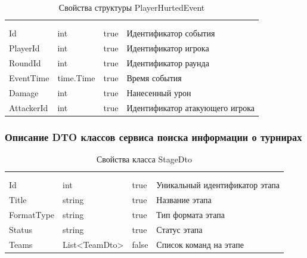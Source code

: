 \begin{xltabular}{\textwidth}{|X|X|X|X|}
	\caption{Свойства структуры PlayerHurtedEvent}\label{table:PlayerHurtedEvent}\\ \hline
	 &  &  &  \\ \hline
	 &  &  &  \\ \hline
	\endfirsthead
	 \hline
	 &  &  &  \\ \hline
	\endhead
	Id & int & true & Идентификатор события \\ \hline
	PlayerId & int & true & Идентификатор игрока \\ \hline
	RoundId & int & true & Идентификатор раунда \\ \hline
	EventTime & time.Time & true & Время события \\ \hline
	Damage & int & true & Нанесенный урон \\ \hline
	AttackerId & int & true & Идентификатор атакующего игрока \\ \hline
\end{xltabular}

\subsubsection{Описание DTO классов сервиса поиска информации о турнирах}

\begin{xltabular}{\textwidth}{|X|X|X|X|}
	\caption{Свойства класса StageDto}\label{table:StageDto}\\ \hline
	 &  &  &  \\ \hline
	 &  &  &  \\ \hline
	\endfirsthead
	 \hline
	 &  &  &  \\ \hline
	\endhead
	Id & int & true & Уникальный идентификатор этапа \\ \hline
	Title & string & true & Название этапа \\ \hline
	FormatType & string & true & Тип формата этапа \\ \hline
	Status & string & true & Статус этапа \\ \hline
	Teams & List<TeamDto> & false & Список команд на этапе \\ \hline
\end{xltabular}

